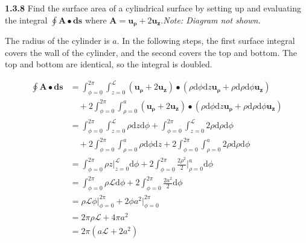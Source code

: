\documentclass{article}
\begin{document}
\textbf{1.3.8} Find the surface area of a cylindrical surface by setting up and evaluating the integral $\oint
	\mathbf{A} \bullet \mathbf{ds}$ where $\mathbf{A} = \mathbf{u_\rho} + 2\mathbf{u_z}$.\@ \textit{Note: Diagram not
	shown.}

\vspace{24pt}

The radius of the cylinder is $a$. In the following steps, the first surface integral covers the wall of the cylinder,
and the second covers the top and bottom. The top and bottom are identical, so the integral is doubled.

\begin{equation*}
	\begin{split}
		\oint \mathbf{A} \bullet \mathbf{ds} & = \int_{\phi=0}^{2\pi} \int_{z=0}^\mathscr{L} (\mathbf{u_\rho} + 2\mathbf{u_z}) \bullet (\rho \text{d}\phi \text{d}z \mathbf{u_\rho} + \rho \text{d}\rho \text{d}\phi \mathbf{u_z}) \\
		& \quad + 2 \int_{\phi=0}^{2\pi} \int_{\rho=0}^a (\mathbf{u_\rho} + 2\mathbf{u_z}) \bullet (\rho \text{d}\phi \text{d}z \mathbf{u_\rho} + \rho \text{d}\rho \text{d}\phi \mathbf{u_z}) \\
		& = \int_{\phi=0}^{2\pi} \int_{z=0}^\mathscr{L} \rho \text{d}z \text{d}\phi + \int_{\phi=0}^{2\pi} \int_{z=0}^\mathscr{L} 2\rho \text{d}\rho \text{d}\phi \\
		& \quad + 2 \int_{\phi=0}^{2\pi} \int_{\rho=0}^a \rho \text{d}\phi \text{d}z + 2 \int_{\phi=0}^{2\pi} \int_{\rho=0}^a 2 \rho \text{d}\rho \text{d}\phi \\
		& = \int_{\phi=0}^{2\pi} \rho z \bigg\rvert_{z=0}^\mathscr{L} \text{d}\phi + 2 \int_{\phi=0}^{2\pi} \frac{2\rho^2}{2}\bigg\rvert_{\rho=0}^a \text{d}\phi \\
		& = \int_{\phi=0}^{2\pi} \rho \mathscr{L} \text{d}\phi + 2 \int_{\phi=0}^{2\pi} \frac{2a^2}{2} \text{d}\phi \\
		& = \rho \mathscr{L} \phi \big\rvert_{\phi=0}^{2\pi} + 2 \phi a^2 \big\rvert_{\phi=0}^{2\pi} \\
		& = 2 \pi \rho \mathscr{L} + 4 \pi a^2 \\
		& = 2 \pi (a \mathscr{L} + 2 a^2)
	\end{split}
\end{equation*}
\end{document}
